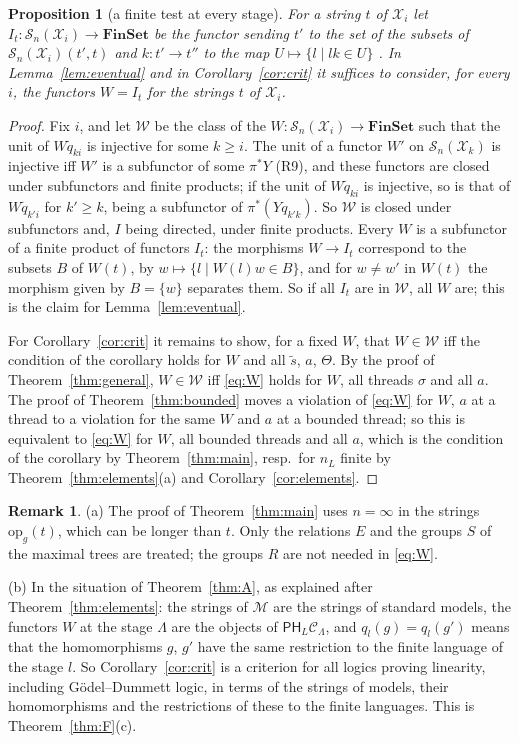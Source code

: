 \documentclass[11pt]{amsart}
\newtheorem{prop}[thm]{Proposition}
\theoremstyle{definition}
\newtheorem{rem}[thm]{Remark}
\newcommand{\Fin}{\mathbf{FinSet}}
\newcommand{\PP}{\mathsf P}
\newcommand{\HH}{\mathsf H}
\newcommand{\cX}{\mathcal X}
\newcommand{\cC}{\mathcal C}
\newcommand{\cM}{\mathcal M}
\newcommand{\cS}{\mathcal S}
\newcommand{\opn}{\mathrm{op}}
\begin{document}
\begin{prop}[a finite test at every stage]\label{prop:ftest}
For a string $t$ of $\cX_i$ let $I_t\colon\cS_n(\cX_i)\to\Fin$ be the
functor sending $t'$ to the set of the subsets of
$\cS_n(\cX_i)(t',t)$ and $k\colon t'\to t''$ to the map $U\mapsto\{l
\mid lk\in U\}$ \cite[\S6, ``a finite test'']{Strings}. In
Lemma~\ref{lem:eventual} and in Corollary~\ref{cor:crit} it suffices
to consider, for every $i$, the functors $W=I_t$ for the strings $t$
of $\cX_i$.
\end{prop}
\begin{proof}
Fix $i$, and let $\mathcal W$ be the class of the $W\colon\cS_n(\cX_i)
\to\Fin$ such that the unit of $W\tilde q_{ki}$ is injective for some
$k\ge i$. The unit of a functor $W'$ on $\cS_n(\cX_k)$ is injective
iff $W'$ is a subfunctor of some $\pi^*Y$ (R9), and these functors are
closed under subfunctors and finite products; if the unit of $W\tilde
q_{ki}$ is injective, so is that of $W\tilde q_{k'i}$ for $k'\ge k$,
being a subfunctor of $\pi^*(Yq_{k'k})$. So $\mathcal W$ is closed
under subfunctors and, $I$ being directed, under finite products.
Every $W$ is a subfunctor of a finite product of functors $I_t$: the
morphisms $W\to I_t$ correspond to the subsets $B$ of $W(t)$, by
$w\mapsto\{l\mid W(l)w\in B\}$, and for $w\ne w'$ in $W(t)$ the
morphism given by $B=\{w\}$ separates them. So if all $I_t$ are in
$\mathcal W$, all $W$ are; this is the claim for
Lemma~\ref{lem:eventual}.

For Corollary~\ref{cor:crit} it remains to show, for a fixed $W$, that
$W\in\mathcal W$ iff the condition of the corollary holds for $W$ and
all $\tilde s$, $a$, $\Theta$. By the proof of
Theorem~\ref{thm:general}, $W\in\mathcal W$ iff \eqref{eq:W} holds for
$W$, all threads $\sigma$ and all $a$. The proof of
Theorem~\ref{thm:bounded} moves a violation of \eqref{eq:W} for $W$,
$a$ at a thread to a violation for the same $W$ and $a$ at a bounded
thread; so this is equivalent to \eqref{eq:W} for $W$, all bounded
threads and all $a$, which is the condition of the corollary by
Theorem~\ref{thm:main}, resp.\ for $n_L$ finite by
Theorem~\ref{thm:elements}(a) and Corollary~\ref{cor:elements}.
\end{proof}

\begin{rem}\label{rem:unbounded}
(a) The proof of Theorem~\ref{thm:main} uses $n=\infty$ in the strings
$\opn_g(t)$, which can be longer than $t$. Only the relations $E$ and
the groups $S$ of the maximal trees are treated; the groups $R$ are
not needed in \eqref{eq:W}.

(b) In the situation of Theorem~\ref{thm:A}, as explained after
Theorem~\ref{thm:elements}: the strings of $\cM$ are the strings of
standard models, the functors $W$ at the stage $\Lambda$ are the
objects of $\PP\HH_L\cC_\Lambda$, and $q_l(g)=q_l(g')$ means that the
homomorphisms $g$, $g'$ have the same restriction to the finite
language of the stage $l$. So Corollary~\ref{cor:crit} is a criterion
for all logics proving linearity, including G\"odel--Dummett logic, in
terms of the strings of models, their homomorphisms and the
restrictions of these to the finite languages. This is
Theorem~\ref{thm:F}(c).
\end{rem}
\end{document}
